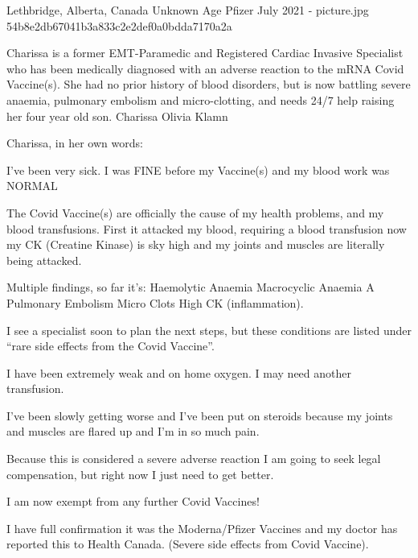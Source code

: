 {Lethbridge, Alberta, Canada}
{Unknown Age}
{Pfizer }
{July 2021}
{-}
{picture.jpg}
{54b8e2db67041b3a833c2e2def0a0bdda7170a2a}
{



Charissa is a former EMT-Paramedic and Registered Cardiac Invasive Specialist who has been medically diagnosed with an adverse reaction to the mRNA Covid Vaccine(s). She had no prior history of blood disorders, but is now battling severe anaemia, pulmonary embolism and micro-clotting, and needs 24/7 help raising her four year old son.
Charissa Olivia Klamn

Charissa, in her own words:

I’ve been very sick. I was FINE before my Vaccine(s) and my blood work was NORMAL

The Covid Vaccine(s) are officially the cause of my health problems, and my blood transfusions. First it attacked my blood, requiring a blood transfusion now my CK (Creatine Kinase) is sky high and my joints and muscles are literally being attacked.

Multiple findings, so far it’s:
Haemolytic Anaemia
Macrocyclic Anaemia
A Pulmonary Embolism
Micro Clots
High CK (inflammation).

I see a specialist soon to plan the next steps, but these conditions are listed under “rare side effects from the Covid Vaccine”.

I have been extremely weak and on home oxygen. I may need another transfusion.

I’ve been slowly getting worse and I’ve been put on steroids because my joints and muscles are flared up and I’m in so much pain.

Because this is considered a severe adverse reaction I am going to seek legal compensation, but right now I just need to get better.

I am now exempt from any further Covid Vaccines!

I have full confirmation it was the Moderna/Pfizer Vaccines and my doctor has reported this to Health Canada. (Severe side effects from Covid Vaccine).
}
